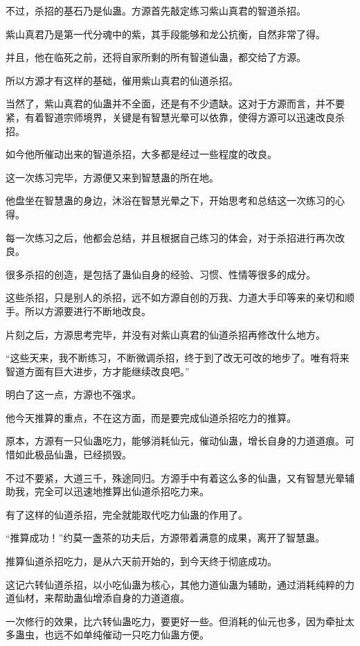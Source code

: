 \begin{this_body}
不过，杀招的基石乃是仙蛊。方源首先敲定练习紫山真君的智道杀招。

紫山真君乃是第一代分魂中的紫，其手段能够和龙公抗衡，自然非常了得。

并且，他在临死之前，还将自家所剩的所有智道仙蛊，都交给了方源。

所以方源才有这样的基础，催用紫山真君的仙道杀招。

当然了，紫山真君的仙蛊并不全面，还是有不少遗缺。这对于方源而言，并不要紧，有着智道宗师境界，关键是有智慧光晕可以依靠，使得方源可以迅速改良杀招。

如今他所催动出来的智道杀招，大多都是经过一些程度的改良。

这一次练习完毕，方源便又来到智慧蛊的所在地。

他盘坐在智慧蛊的身边，沐浴在智慧光晕之下，开始思考和总结这一次练习的心得。

每一次练习之后，他都会总结，并且根据自己练习的体会，对于杀招进行再次改良。

很多杀招的创造，是包括了蛊仙自身的经验、习惯、性情等很多的成分。

这些杀招，只是别人的杀招，远不如方源自创的万我、力道大手印等来的亲切和顺手。所以方源要进行不断地改良。

片刻之后，方源思考完毕，并没有对紫山真君的仙道杀招再修改什么地方。

“这些天来，我不断练习，不断微调杀招，终于到了改无可改的地步了。唯有将来智道方面有巨大进步，方才能继续改良吧。”

明白了这一点，方源也不强求。

他今天推算的重点，不在这方面，而是要完成仙道杀招吃力的推算。

原本，方源有一只仙蛊吃力，能够消耗仙元，催动仙蛊，增长自身的力道道痕。可惜如此极品仙蛊，已经损毁。

不过不要紧，大道三千，殊途同归。方源手中有着这么多的仙蛊，又有智慧光晕辅助我，完全可以迅速地推算出仙道杀招吃力来。

有了这样的仙道杀招，完全就能取代吃力仙蛊的作用了。

“推算成功！”约莫一盏茶的功夫后，方源带着满意的成果，离开了智慧蛊。

推算仙道杀招吃力，是从六天前开始的，到今天终于彻底成功。

这记六转仙道杀招，以小吃仙蛊为核心，其他力道仙蛊为辅助，通过消耗纯粹的力道仙材，来帮助蛊仙增添自身的力道道痕。

一次修行的效果，比六转仙蛊吃力，要更好一些。但消耗的仙元也多，因为牵扯太多蛊虫，也远不如单纯催动一只吃力仙蛊方便。


\end{this_body}
